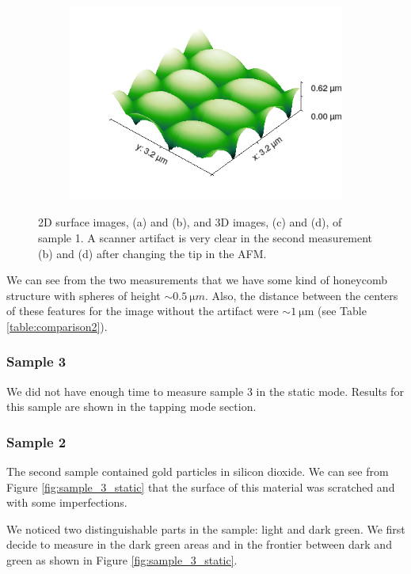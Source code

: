 \documentclass[11pt,a4paper]{article}
\begin{document}
\begin{figure}[H]
\begin{subfigure}[b]{0.45\textwidth}
\caption{}
\end{subfigure}
\begin{subfigure}[b]{0.45\textwidth}
\includegraphics[width=\textwidth]{sm_sample1_dir2_3D}
\caption{}
\end{subfigure}
\caption{2D surface images, (a) and (b), and 3D images, (c) and (d), of sample 1. A scanner artifact is very clear in the second measurement (b) and (d) after changing the tip in the AFM.}
\end{figure}

We can see from the two measurements that we have some kind of honeycomb structure with spheres of height $\sim\SI{0.5}{\micro m}$. Also, the distance between the centers of these features for the image without the artifact were $\sim\SI{1}{\micro\m}$ (see Table \ref{table:comparison2}).

\newpage
\subsubsection{Sample 3}
We did not have enough time to measure sample 3 in the static mode. Results for this sample are shown in the tapping mode section.

\subsubsection{Sample 2}
The second sample contained gold particles in silicon dioxide. We can see from Figure \ref{fig:sample_3_static} that the surface of this material was scratched and with some imperfections.

We noticed two distinguishable parts in the sample: light and dark green. We first decide to measure in the dark green areas and in the frontier between dark and green as shown in Figure \ref{fig:sample_3_static}.
\end{document}
